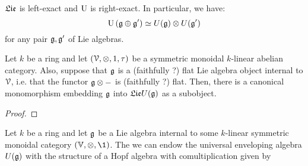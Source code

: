     \begin{corollary}
        $\mathfrak{Lie}$ is left-exact and $\mathrm{U}$ is right-exact. In particular, we have:
            $$\U\left(\g \oplus \g'\right) \cong U(\g) \tensor U(\g')$$
        for any pair $\mathfrak{g}, \mathfrak{g}'$ of Lie algebras. 
    \end{corollary}
    \begin{theorem} \label{theorem: embedding_lie_algebras_into_their_universal_enveloping_algebras}
        Let $k$ be a ring and let $(\calV, \tensor, 1, \tau)$ be a symmetric monoidal $k$-linear abelian category. Also, suppose that $\mathfrak{g}$ is a (faithfully ?) flat Lie algebra object internal to $\mathcal{V}$, i.e. that the functor $\g \tensor -$ is (faithfully ?) flat. Then, there is a canonical monomorphism embedding $\mathfrak{g}$ into $\mathfrak{Lie} U(\mathfrak{g})$ as a subobject.
    \end{theorem}
        \begin{proof}
            
        \end{proof}
    \begin{corollary} \label{coro: universal_enveloping_algebras_are_bialgebras}
        Let $k$ be a ring and let $\mathfrak{g}$ be a Lie algebra internal to some $k$-linear symmetric monoidal category $(\V, \tensor, \1)$. The we can endow the universal enveloping algebra $U(\mathfrak{g})$ with the structure of a Hopf algebra with comultiplication given by 
    \end{corollary}
    
